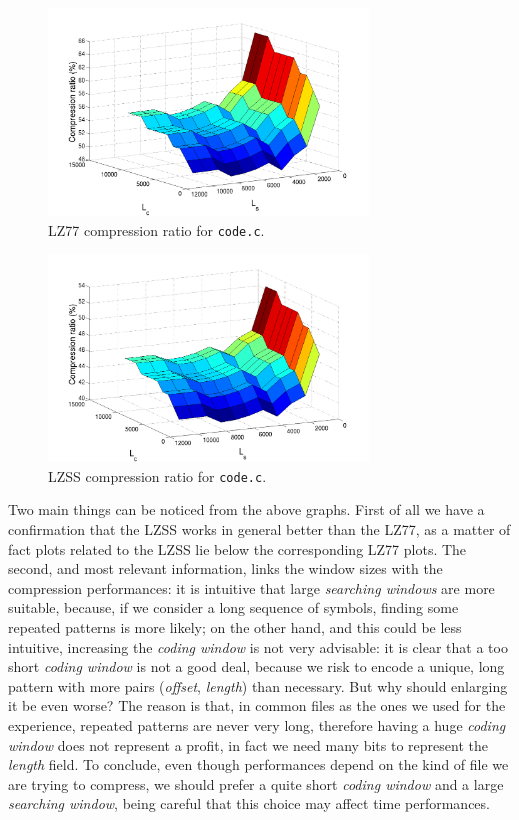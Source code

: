 \begin{center}
\begin{figure}[H]
\includegraphics[width=8.5cm]{images/lz77_6.png}
\caption{LZ77 compression ratio for \texttt{code.c}.}
\end{figure}
\end{center}

\begin{center}
\begin{figure}[H]
\includegraphics[width=8.5cm]{images/lzss_6.png}
\caption{LZSS compression ratio for \texttt{code.c}.}
\end{figure}
\end{center}

Two main things can be noticed from the above graphs. First of all we have a confirmation that the LZSS works in general better than the LZ77, as a matter of fact plots related to the LZSS lie below the corresponding LZ77 plots. The second, and most relevant information, links the window sizes with the compression performances: it is intuitive that large \textit{searching windows} are more suitable, because, if we consider a long sequence of symbols, finding some repeated patterns is more likely; on the other hand, and this could be less intuitive, increasing the \textit{coding window} is not very advisable: it is clear that a too short \textit{coding window} is not a good deal, because we risk to encode a unique, long pattern with more pairs (\textit{offset}, \textit{length}) than necessary. But why should enlarging it be even worse? The reason is that, in common files as the ones we used for the experience, repeated patterns are never very long, therefore having a huge \textit{coding window} does not represent a profit, in fact we need many bits to represent the \textit{length} field. To conclude, even though performances depend on the kind of file we are trying to compress, we should prefer a quite short \textit{coding window} and a large \textit{searching window}, being careful that this choice may affect time performances.


